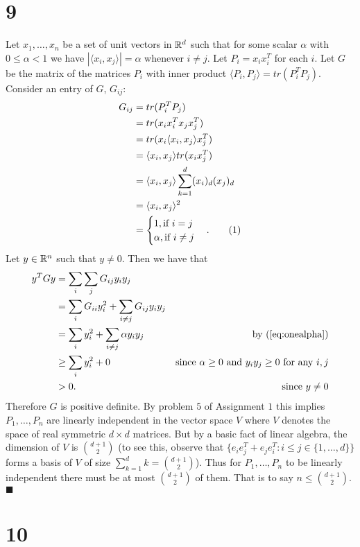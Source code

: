 \documentclass[letterpaper,12pt,oneside,onecolumn]{article}
\newcommand\numberthis{\addtocounter{equation}{1}\tag{\theequation}}
\begin{document}
\section*{9}
Let $x_1, \dots, x_n$ be a set of unit vectors in $\mathbb{R}^d$ such that for some scalar $\alpha$ with $0 \leq \alpha < 1$ we have $|\langle x_i, x_j \rangle | = \alpha$ whenever $i \neq j$. Let $P_i = x_i x_i^T$ for each $i$. Let $G$ be the matrix of the matrices $P_i$ with inner product $\langle P_i, P_j \rangle = tr(P_i^T P_j)$. Consider an entry of $G$, $G_{ij}$:
\begin{align*}
G_{ij} &= tr(P_i^T P_j) \\
&= tr(x_i x_i^T x_j x_j^T) \\
&= tr(x_i \langle x_i, x_j \rangle x_j^T) \\
&= \langle x_i, x_j \rangle tr(x_i x_j^T) \\
&= \langle x_i, x_j \rangle \sum_{k=1}^d (x_i)_d (x_j)_d \\
&= \langle x_i, x_j \rangle ^2\\
&= \begin{cases}
1, \text{if $i=j$}\\
\alpha, \text{if $i \neq j$}
\end{cases}. \numberthis \label{eq:onealpha}
\end{align*}
Let $y \in \mathbb{R}^n$ such that $y \neq 0$. Then we have that
\begin{align*}
y^TGy &= \sum_{i} \sum_{j} G_{ij} y_i y_j\\
&= \sum_{i} G_{ii} y_i^2 + \sum_{i \neq j} G_{ij} y_i y_j \\
&= \sum_{i} y_i^2 + \sum_{i \neq j} \alpha y_i y_j &\text{by (\ref{eq:onealpha})}\\
&\geq \sum_{i} y_i^2 +0 &\text{since $\alpha \geq 0$ and $y_i y_j \geq 0$ for any $i,j$} \\
&> 0. &\text{since $y\neq0$}
\end{align*}
Therefore $G$ is positive definite. By problem $5$ of Assignment $1$ this implies $P_1, \dots, P_n$ are linearly independent in the vector space $V$ where $V$ denotes the space of real symmetric $d \times d$ matrices. But by a basic fact of linear algebra, the dimension of $V$ is $d+1 \choose 2$ (to see this, observe that $\{e_ie_j^T + e_je_i^T : i \leq j \in \{1,\dots,d\}\}$ forms a basis of $V$ of size $\sum_{k=1}^d k = $$d+1\choose 2$). Thus for $P_1, \dots, P_n$ to be linearly independent there must be at most $d+1 \choose 2$ of them. That is to say $n \leq $$d+1 \choose 2$. $\blacksquare$
\section*{10}
\end{document}
